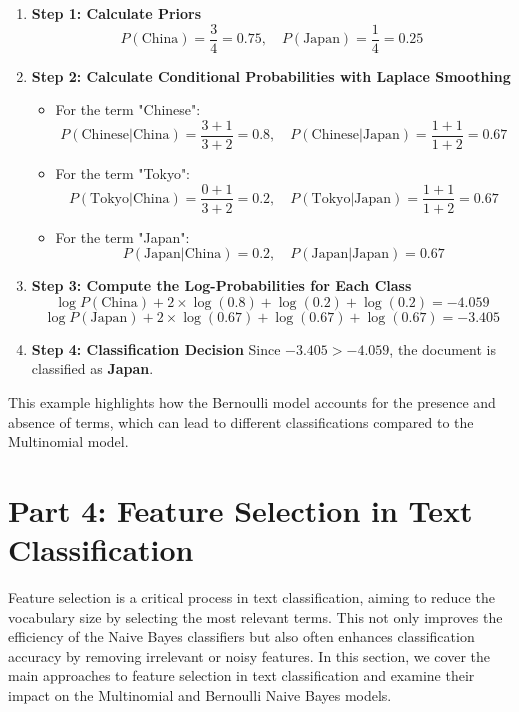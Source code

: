 \documentclass{article}
\begin{document}
\begin{enumerate}
    \item \textbf{Step 1: Calculate Priors}
    \[
    P(\text{China}) = \frac{3}{4} = 0.75, \quad P(\text{Japan}) = \frac{1}{4} = 0.25
    \]

    \item \textbf{Step 2: Calculate Conditional Probabilities with Laplace Smoothing}
    \begin{itemize}
        \item For the term "Chinese":
        \[
        P(\text{Chinese} | \text{China}) = \frac{3 + 1}{3 + 2} = 0.8, \quad P(\text{Chinese} | \text{Japan}) = \frac{1 + 1}{1 + 2} = 0.67
        \]

        \item For the term "Tokyo":
        \[
        P(\text{Tokyo} | \text{China}) = \frac{0 + 1}{3 + 2} = 0.2, \quad P(\text{Tokyo} | \text{Japan}) = \frac{1 + 1}{1 + 2} = 0.67
        \]

        \item For the term "Japan":
        \[
        P(\text{Japan} | \text{China}) = 0.2, \quad P(\text{Japan} | \text{Japan}) = 0.67
        \]
    \end{itemize}

    \item \textbf{Step 3: Compute the Log-Probabilities for Each Class}
    \[
    \log P(\text{China}) + 2 \times \log(0.8) + \log(0.2) + \log(0.2) = -4.059
    \]
    \[
    \log P(\text{Japan}) + 2 \times \log(0.67) + \log(0.67) + \log(0.67) = -3.405
    \]

    \item \textbf{Step 4: Classification Decision}
    Since \( -3.405 > -4.059 \), the document is classified as \textbf{Japan}.
\end{enumerate}

This example highlights how the Bernoulli model accounts for the presence and absence of terms, which can lead to different classifications compared to the Multinomial model.

\section*{Part 4: Feature Selection in Text Classification}

Feature selection is a critical process in text classification, aiming to reduce the vocabulary size by selecting the most relevant terms. This not only improves the efficiency of the Naive Bayes classifiers but also often enhances classification accuracy by removing irrelevant or noisy features. In this section, we cover the main approaches to feature selection in text classification and examine their impact on the Multinomial and Bernoulli Naive Bayes models.
\end{document}
